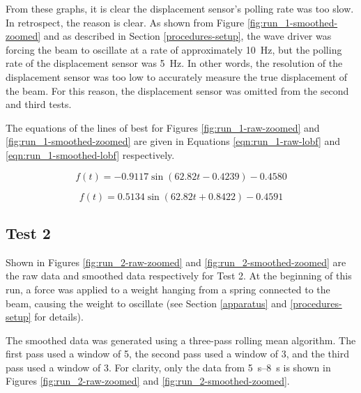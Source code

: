 \documentclass[12 pt]{report}
\begin{document}
From these graphs, it is clear the displacement sensor's polling rate was too slow. In retrospect, the reason is clear. As shown from Figure \ref{fig:run_1-smoothed-zoomed} and as described in Section \ref{procedures-setup}, the wave driver was forcing the beam to oscillate at a rate of approximately \qty{10}{\hertz}, but the polling rate of the displacement sensor was \qty{5}{\hertz}. In other words, the resolution of the displacement sensor was too low to accurately measure the true displacement of the beam. For this reason, the displacement sensor was omitted from the second and third tests.

The equations of the lines of best for Figures \ref{fig:run_1-raw-zoomed} and \ref{fig:run_1-smoothed-zoomed} are given in Equations \ref{eqn:run_1-raw-lobf} and \ref{eqn:run_1-smoothed-lobf} respectively.

\begin{equation} \label{eqn:run_1-raw-lobf}
f(t)=-0.9117\sin(62.82t-0.4239)-0.4580
\end{equation}

\begin{equation} \label{eqn:run_1-smoothed-lobf}
f(t)=0.5134\sin(62.82t+0.8422)-0.4591
\end{equation}

\subsection{Test 2} \label{data-test_2}
Shown in Figures \ref{fig:run_2-raw-zoomed} and \ref{fig:run_2-smoothed-zoomed} are the raw data and smoothed data respectively for Test \num{2}. At the beginning of this run, a force was applied to a weight hanging from a spring connected to the beam, causing the weight to oscillate (see Section \ref{apparatus} and \ref{procedures-setup} for details).

The smoothed data was generated using a three-pass rolling mean algorithm. The first pass used a window of \num{5}, the second pass used a window of \num{3}, and the third pass used a window of \num{3}. For clarity, only the data from \qtyrange{5}{8}{\s} is shown in Figures \ref{fig:run_2-raw-zoomed} and \ref{fig:run_2-smoothed-zoomed}.
\end{document}
